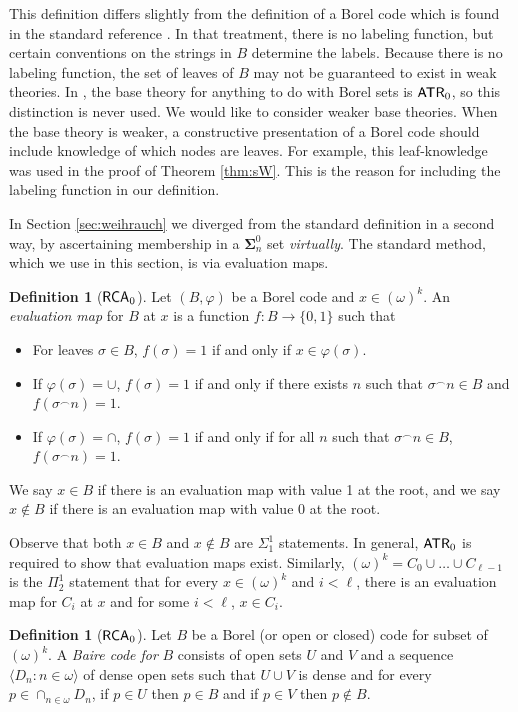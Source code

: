 \documentclass{amsart}
\theoremstyle{definition}
\newtheorem{defn}[thm]{Definition}
\theoremstyle{remark}
\newcommand{\system}[1]{\mbox{\fontfamily{cmss}\fontshape{n}\fontseries{m}%
    \selectfont#1}}
\newcommand{\RCA}{\system{RCA}\ensuremath{_0}}
\newcommand{\ATR}{\system{ATR}\ensuremath{_0}}
\newcommand{\concat}{^\smallfrown}
\begin{document}
This definition differs slightly from the definition of a Borel code 
which is found in the standard reference \cite{sosa}.  In that 
treatment, there is no labeling function, but certain conventions 
on the strings in $B$ determine the labels. Because there is no labeling
function, the set of leaves of $B$ may not be guaranteed to exist
in weak theories.  In \cite{sosa}, the base theory for anything to 
do with Borel sets is $\ATR$, so this distinction is never used.  
We would like to consider weaker 
base theories.  When the base theory is weaker,  
a constructive presentation of a Borel code should include
knowledge of which nodes are leaves.  For example, this 
leaf-knowledge was used in the proof of Theorem \ref{thm:sW}.
This is the reason for 
including the labeling function in our definition.  

In Section \ref{sec:weihrauch} we diverged from the standard
definition in a second way, by ascertaining membership
in a $\mathbf \Sigma^0_n$ set \emph{virtually}.  The standard 
method, which we use in this section, is via evaluation maps.
\begin{defn}[$\RCA$] \label{defn:eval}
Let $(B,\varphi)$ be a Borel code and $x \in (\omega)^k$.
An \emph{evaluation map} for $B$ at $x$ is a function 
$f:B \rightarrow \{ 0,1 \}$ such that
\begin{itemize}
\item For leaves $\sigma \in B$, $f(\sigma) = 1$ if and only if $x \in \varphi(\sigma)$.
\item If $\varphi(\sigma) = \cup$, $f(\sigma) = 1$ if and only if there 
exists $n$ such that $\sigma\concat n \in B$ and $f(\sigma\concat n) = 1$.
\item If $\varphi(\sigma) = \cap$, $f(\sigma) = 1$ if and only if for all $n$ such that $\sigma\concat n \in B$, $f(\sigma\concat n) = 1$.
\end{itemize}
 We say $x \in B$ if there is an 
evaluation map with value 1 at the root, and we say $x \not \in B$ if there is an evaluation map with value 0 at the root. 
\end{defn}

Observe that both $x \in B$ and $x \not \in B$ 
are $\Sigma^1_1$ statements. In general, $\ATR$ is required to show that evaluation maps exist. Similarly, $(\omega)^k = C_0 \cup \ldots \cup C_{\ell-1}$ is the 
$\Pi^1_2$ statement that for every $x \in (\omega)^k$ and $i < \ell$, there is an evaluation map for $C_i$ at $x$ and for some $i < \ell$, $x \in C_i$.


\begin{defn}[$\RCA$]\label{defn:bairecode}
Let $B$ be a Borel (or open or closed) code for subset of $(\omega)^k$. A \textit{Baire code for} $B$ consists of open sets $U$ and $V$ and a sequence 
$\langle D_n : n \in \omega \rangle$ of 
dense open sets such that $U \cup V$ is dense and for every $p \in \cap_{n \in \omega} D_n$, if $p \in U$ then $p \in B$ and if $p \in V$ then $p \not \in B$.  
\end{defn}
\end{document}
